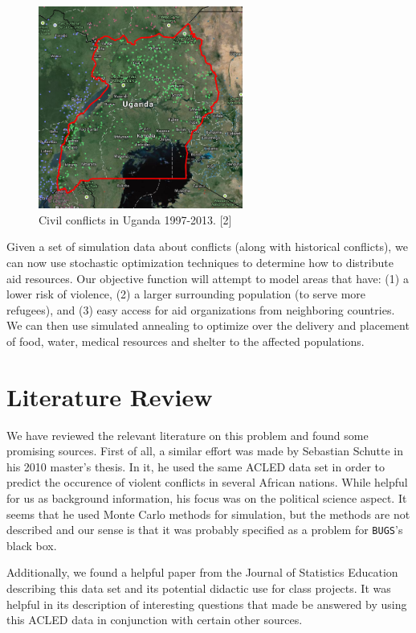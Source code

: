 \documentclass{article} %
\begin{document}
\begin{figure}
  \centering
  \includegraphics[width=0.6\textwidth]{uganda.png}
  \caption{Civil conflicts in Uganda 1997-2013. [2]}
  \label{fig:map}
\end{figure}

Given a set of simulation data about conflicts (along with historical conflicts), we can now use stochastic optimization techniques
to determine how to distribute aid resources. Our objective function will attempt to model areas that have: (1) a lower risk of violence, (2) a larger 
surrounding population (to serve more refugees), and (3) easy access for aid organizations from neighboring countries. We can then use simulated annealing to optimize over the delivery and placement of food, water, medical resources and shelter to the affected populations.

\section*{Literature Review}

We have reviewed the relevant literature on this problem and found some promising sources. First of
all, a similar effort was made by Sebastian Schutte in his 2010 master's thesis. In it, he used the same ACLED data set in order to predict the occurence of violent conflicts in several African nations. While helpful for us as background information, his focus was on the political science aspect. It seems that he used Monte Carlo methods for simulation, but the methods are not described and our sense is that it was probably specified as a problem for \verb+BUGS+'s black box.

Additionally, we found a helpful paper from the Journal of Statistics Education describing this data set and its potential didactic use for class projects. It was helpful in its description of interesting questions that made be answered by using this ACLED data in conjunction with certain other sources.
\end{document}
